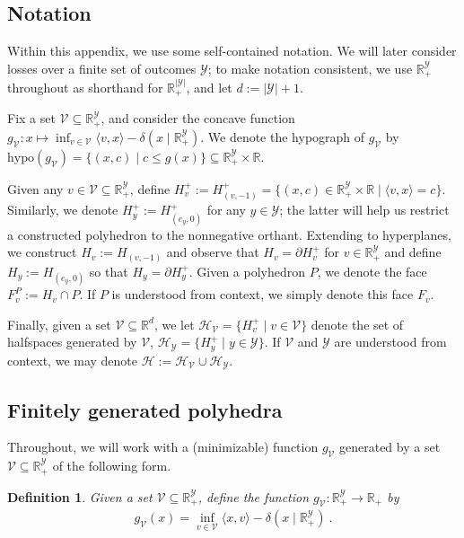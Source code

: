 \documentclass[11pt]{article}
\newcommand{\reals}{\mathbb{R}}
\renewcommand{\H}{\mathcal{H}}
\newcommand{\V}{\mathcal{V}}
\newcommand{\Y}{\mathcal{Y}}
\newcommand{\inprod}[2]{\langle #1, #2 \rangle}%
\newcommand{\hyp}{\mathrm{hypo}}
\newtheorem{definition}{Definition}
\begin{document}
\subsection{Notation}\label{appsubsec:notation}
Within this appendix, we use some self-contained notation.
We will later consider losses over a finite set of outcomes $\Y$; to make notation consistent, we use $\reals^\Y_+$ throughout as shorthand for $\reals^{|\Y|}_+$, and let $d := |\Y|+1$.

Fix a set $\V \subseteq \reals^\Y_+$, and consider the concave function $g_\V : x \mapsto \inf_{v \in \V}\inprod{v}{x} - \delta(x \mid \reals^\Y_+)$.
We denote the hypograph of $g_\V$ by $\hyp(g_\V) = \{(x,c) \mid c \leq g(x)\} \subseteq \reals^\Y_+ \times \reals$.

Given any $v \in \V \subseteq \reals^\Y_+$, define $H^+_v := H^+_{(v, -1)} = \{(x, c) \in \reals^{\Y}_+ \times \reals \mid \inprod{v}{x} = c\}$.
Similarly, we denote $H_y^+ := H_{(e_y, 0)}^+$ for any $y \in \Y$; the latter will help us restrict a constructed polyhedron to the nonnegative orthant. 
Extending to hyperplanes, we construct $H_v := H_{(v,-1)}$ and observe that $H_v = \partial H^+_v$ for $v \in \reals^\Y_+$ and define $H_y := H_{(e_y, 0)}$ so that $H_y = \partial H^+_y$.
Given a polyhedron $P$, we denote the face $F^P_v := H_v \cap P$.
If $P$ is understood from context, we simply denote this face $F_v$. 

Finally, given a set $\V \subseteq \reals^d$, we let $\H_{\V} = \{H_v^+ \mid v\in\V\}$ denote the set of halfspaces generated by $\V$, $\H_\Y = \{H_y^+ \mid y\in\Y\}$.
If $\V$ and $\Y$ are understood from context, we may denote $\H := \H_\V \cup\H_\Y$.


\subsection{Finitely generated polyhedra}\label{appsubsec:phase1}
Throughout, we will work with a (minimizable) function $g_\V$ generated by a set $\V \subseteq \reals^\Y_+$ of the following form.

\begin{definition}\label{def:g-finite}
  Given a set $\V \subseteq \reals^\Y_+$, define the function $g_\V : \reals_+^\Y \to \reals_+$ by
  \begin{align*}
    g_\V(x) = \inf_{v\in\V} \inprod{x}{v} - \delta(x \mid \reals_+^\Y)~. %
  \end{align*}
\end{definition}
\end{document}
